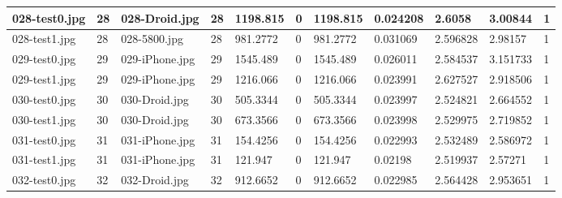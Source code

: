 \begin{landscape}
\begin{longtable}{|p{2cm}|p{1cm}|p{2cm}|p{1cm}|p{2cm}|p{1cm}|p{2cm}|p{2cm}|p{2cm}|p{2cm}|p{1cm}|}
		028-test0.jpg   & 28               & 028-Droid.jpg         & 28                          & 1198.815              & 0                       & 1198.815                   & 0.024208              & 2.6058                & 3.00844                  & 1                \\ \hline
		028-test1.jpg   & 28               & 028-5800.jpg          & 28                          & 981.2772              & 0                       & 981.2772                   & 0.031069              & 2.596828              & 2.98157                  & 1                \\ \hline
		029-test0.jpg   & 29               & 029-iPhone.jpg        & 29                          & 1545.489              & 0                       & 1545.489                   & 0.026011              & 2.584537              & 3.151733                 & 1                \\ \hline
		029-test1.jpg   & 29               & 029-iPhone.jpg        & 29                          & 1216.066              & 0                       & 1216.066                   & 0.023991              & 2.627527              & 2.918506                 & 1                \\ \hline
		030-test0.jpg   & 30               & 030-Droid.jpg         & 30                          & 505.3344              & 0                       & 505.3344                   & 0.023997              & 2.524821              & 2.664552                 & 1                \\ \hline
		030-test1.jpg   & 30               & 030-Droid.jpg         & 30                          & 673.3566              & 0                       & 673.3566                   & 0.023998              & 2.529975              & 2.719852                 & 1                \\ \hline
		031-test0.jpg   & 31               & 031-iPhone.jpg        & 31                          & 154.4256              & 0                       & 154.4256                   & 0.022993              & 2.532489              & 2.586972                 & 1                \\ \hline
		031-test1.jpg   & 31               & 031-iPhone.jpg        & 31                          & 121.947               & 0                       & 121.947                    & 0.02198               & 2.519937              & 2.57271                  & 1                \\ \hline
		032-test0.jpg   & 32               & 032-Droid.jpg         & 32                          & 912.6652              & 0                       & 912.6652                   & 0.022985              & 2.564428              & 2.953651                 & 1                \\ \hline

\end{longtable}
\end{landscape}
